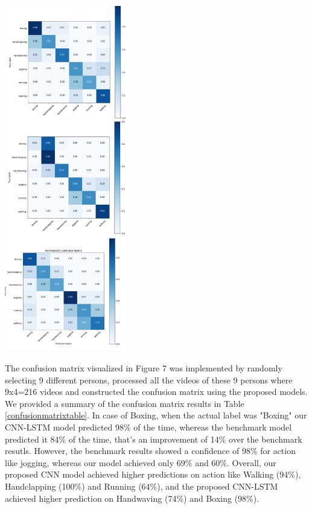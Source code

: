 \documentclass{vldb}
\begin{document}
\begin{center}
    \includegraphics[width=0.4\textwidth]{photo/m.jpg}
    \label{fig:mc-1}
\end{center}

The confusion matrix visualized in Figure 7 was implemented by randomly selecting 9 different persons, processed all the videos of these 9 persons where 9x4=216 videos and constructed the confusion matrix using the proposed models. We provided a summary of the confusion matrix results in Table \ref{confusionmatrixtable}. In case of Boxing, when the actual label was "Boxing" our CNN-LSTM model predicted 98\% of the time, whereas the benchmark model predicted it 84\% of the time, that's an improvement of 14\% over the benchmark resutls. However, the benchmark results showed a confidence of 98\% for action like jogging, whereas our model achieved only 69\% and 60\%. Overall, our proposed CNN model achieved higher predictions on action like Walking (94\%), Handclapping (100\%) and Running (64\%), and the proposed CNN-LSTM achieved higher prediction on Handwaving (74\%) and Boxing (98\%).\\
\end{document}
